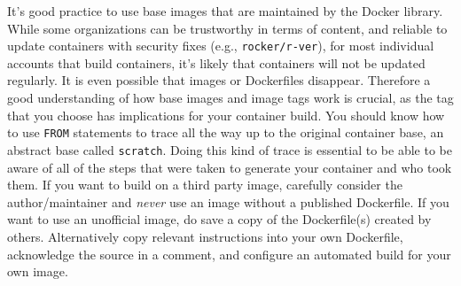 \documentclass[10pt,letterpaper]{article}
\begin{document}
It's good practice to use base images that are maintained by the Docker
library. While some organizations can be trustworthy in terms of
content, and reliable to update containers with security fixes (e.g.,
\texttt{rocker/r-ver}), for most individual accounts that build
containers, it's likely that containers will not be updated regularly.
It is even possible that images or Dockerfiles disappear. Therefore a
good understanding of how base images and image tags work is crucial, as
the tag that you choose has implications for your container build. You
should know how to use \texttt{FROM} statements to trace all the way up
to the original container base, an abstract base called
\texttt{scratch}. Doing this kind of trace is essential to be able to be
aware of all of the steps that were taken to generate your container and
who took them. If you want to build on a third party image, carefully
consider the author/maintainer and \emph{never} use an image without a
published Dockerfile. If you want to use an unofficial image, do save a
copy of the Dockerfile(s) created by others. Alternatively copy relevant
instructions into your own Dockerfile, acknowledge the source in a
comment, and configure an automated build for your own image.
\end{document}
